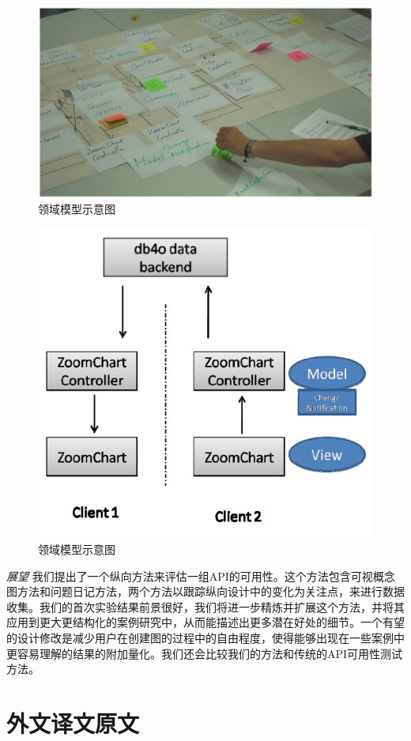 \begin{figure}[!hbp]
  \begin{center}
    \includegraphics[scale=0.3]{figures/translation/translation_api_fig5.png}\\
    领域模型示意图
  \end{center}
\end{figure}

\begin{figure}[!hbp]
  \begin{center}
    \includegraphics[scale=0.3]{figures/translation/translation_api_fig6.png}\\
    领域模型示意图
  \end{center}
\end{figure}

\textit{展望}
我们提出了一个纵向方法来评估一组API的可用性。这个方法包含可视概念图方法和问题日记方法，两个方法以跟踪纵向设计中的变化为关注点，来进行数据收集。我们的首次实验结果前景很好，我们将进一步精炼并扩展这个方法，并将其应用到更大更结构化的案例研究中，从而能描述出更多潜在好处的细节。一个有望的设计修改是减少用户在创建图的过程中的自由程度，使得能够出现在一些案例中更容易理解的结果的附加量化。我们还会比较我们的方法和传统的API可用性测试方法。

\section*{外文译文原文}

